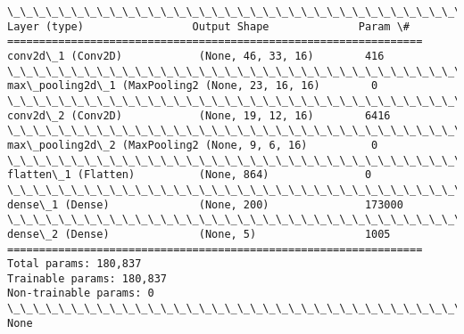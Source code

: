 \documentclass[11pt]{article}
\begin{document}
    \begin{Verbatim}[commandchars=\\\{\}]
\_\_\_\_\_\_\_\_\_\_\_\_\_\_\_\_\_\_\_\_\_\_\_\_\_\_\_\_\_\_\_\_\_\_\_\_\_\_\_\_\_\_\_\_\_\_\_\_\_\_\_\_\_\_\_\_\_\_\_\_\_\_\_\_\_
Layer (type)                 Output Shape              Param \#   
=================================================================
conv2d\_1 (Conv2D)            (None, 46, 33, 16)        416       
\_\_\_\_\_\_\_\_\_\_\_\_\_\_\_\_\_\_\_\_\_\_\_\_\_\_\_\_\_\_\_\_\_\_\_\_\_\_\_\_\_\_\_\_\_\_\_\_\_\_\_\_\_\_\_\_\_\_\_\_\_\_\_\_\_
max\_pooling2d\_1 (MaxPooling2 (None, 23, 16, 16)        0         
\_\_\_\_\_\_\_\_\_\_\_\_\_\_\_\_\_\_\_\_\_\_\_\_\_\_\_\_\_\_\_\_\_\_\_\_\_\_\_\_\_\_\_\_\_\_\_\_\_\_\_\_\_\_\_\_\_\_\_\_\_\_\_\_\_
conv2d\_2 (Conv2D)            (None, 19, 12, 16)        6416      
\_\_\_\_\_\_\_\_\_\_\_\_\_\_\_\_\_\_\_\_\_\_\_\_\_\_\_\_\_\_\_\_\_\_\_\_\_\_\_\_\_\_\_\_\_\_\_\_\_\_\_\_\_\_\_\_\_\_\_\_\_\_\_\_\_
max\_pooling2d\_2 (MaxPooling2 (None, 9, 6, 16)          0         
\_\_\_\_\_\_\_\_\_\_\_\_\_\_\_\_\_\_\_\_\_\_\_\_\_\_\_\_\_\_\_\_\_\_\_\_\_\_\_\_\_\_\_\_\_\_\_\_\_\_\_\_\_\_\_\_\_\_\_\_\_\_\_\_\_
flatten\_1 (Flatten)          (None, 864)               0         
\_\_\_\_\_\_\_\_\_\_\_\_\_\_\_\_\_\_\_\_\_\_\_\_\_\_\_\_\_\_\_\_\_\_\_\_\_\_\_\_\_\_\_\_\_\_\_\_\_\_\_\_\_\_\_\_\_\_\_\_\_\_\_\_\_
dense\_1 (Dense)              (None, 200)               173000    
\_\_\_\_\_\_\_\_\_\_\_\_\_\_\_\_\_\_\_\_\_\_\_\_\_\_\_\_\_\_\_\_\_\_\_\_\_\_\_\_\_\_\_\_\_\_\_\_\_\_\_\_\_\_\_\_\_\_\_\_\_\_\_\_\_
dense\_2 (Dense)              (None, 5)                 1005      
=================================================================
Total params: 180,837
Trainable params: 180,837
Non-trainable params: 0
\_\_\_\_\_\_\_\_\_\_\_\_\_\_\_\_\_\_\_\_\_\_\_\_\_\_\_\_\_\_\_\_\_\_\_\_\_\_\_\_\_\_\_\_\_\_\_\_\_\_\_\_\_\_\_\_\_\_\_\_\_\_\_\_\_
None

    \end{Verbatim}
\end{document}
